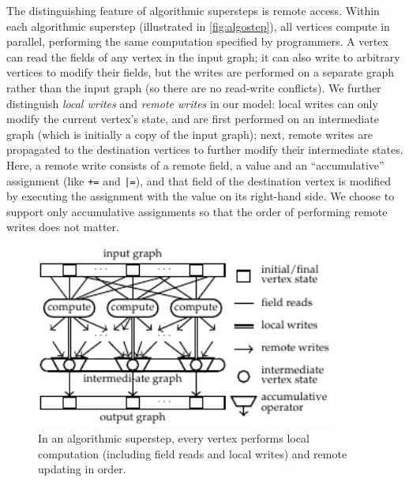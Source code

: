 \documentclass{sokendai_thesis} %
\begin{document}
The distinguishing feature of algorithmic supersteps is remote access.
Within each algorithmic superstep (illustrated in \autoref{fig:algostep}), all vertices compute in parallel, performing the same computation specified by programmers.
A vertex can read the fields of any vertex in the input graph; it can also write to arbitrary vertices to modify their fields, but the writes are performed on a separate graph rather than the input graph (so there are no read-write conflicts).
We further distinguish \emph{local writes} and \emph{remote writes} in our model:
local writes can only modify the current vertex's state, and are first performed on an intermediate graph (which is initially a copy of the input graph);
next, remote writes are propagated to the destination vertices to further modify their intermediate states.
Here, a remote write consists of a remote field, a value and an ``accumulative'' assignment (like \texttt{+=} and \texttt{|=}), and that field of the destination vertex is modified by executing the assignment with the value on its right-hand side.
We choose to support only accumulative assignments so that the order of performing remote writes does not matter.

\begin{figure}[t]
 \centering
 \includegraphics[width=0.9\textwidth]{figures/model.pdf}
 \vspace{-2ex}
 \caption{In an algorithmic superstep, every vertex performs local computation (including field reads and local writes) and remote updating in order.}
 \label{fig:algostep}
\end{figure}
\end{document}
